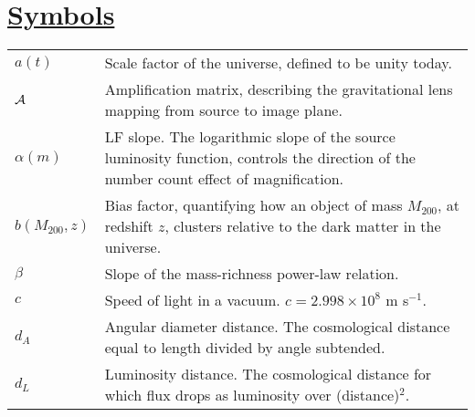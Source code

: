 \section*{\underline{Symbols}}
\begin{tabular}{p{0.6in}p{5.8in}}

$a(t)$ & Scale factor of the universe, defined to be unity today. \\
$\cal{A}$ & Amplification matrix, describing the gravitational lens mapping from source to image plane. \\
$\alpha(m)$ & \acs{LF} slope. The logarithmic slope of the source luminosity function, controls the direction of the number count effect of magnification. \\
$b(M_{200},z)$ & Bias factor, quantifying how an object of mass $M_{200}$, at redshift $z$, clusters relative to the dark matter in the universe. \\ 
$\beta$ & Slope of the mass-richness power-law relation. \\
$c$ & Speed of light in a vacuum. $c = 2.998 \times 10^8$ m s$^{-1}$. \\
$d_A$ & Angular diameter distance. The cosmological distance equal to length divided by angle subtended. \\
$d_L$ & Luminosity distance. The cosmological distance for which flux drops as luminosity over (distance)$^2$. \\

\end{tabular}
